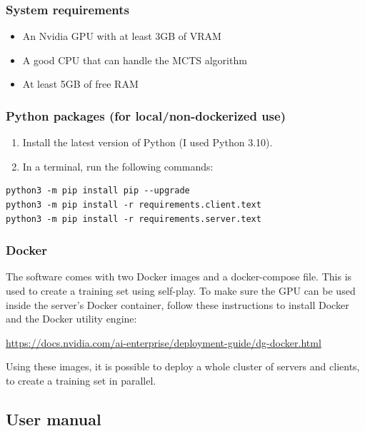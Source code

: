 \documentclass{article}
\begin{document}
\subsubsection{System requirements}

\begin{itemize}
	\item An Nvidia GPU with at least 3GB of VRAM
	\item A good CPU that can handle the MCTS algorithm
	\item At least 5GB of free RAM
\end{itemize}

\subsubsection{Python packages (for local/non-dockerized use)}

\begin{enumerate}
	\item Install the latest version of Python (I used Python 3.10). 
	\item In a terminal, run the following commands:
\end{enumerate}

\begin{verbatim}
python3 -m pip install pip --upgrade
python3 -m pip install -r requirements.client.text
python3 -m pip install -r requirements.server.text
\end{verbatim}

\subsubsection{Docker}

The software comes with two Docker images and a docker-compose file.
This is used to create a training set using self-play. 
To make sure the GPU can be used inside the server's Docker container,
follow these instructions to install Docker and the Docker utility engine:

\url{https://docs.nvidia.com/ai-enterprise/deployment-guide/dg-docker.html}

Using these images, it is possible to deploy a whole cluster of servers and clients,
to create a training set in parallel.


\newpage
\subsection{User manual}
\end{document}
